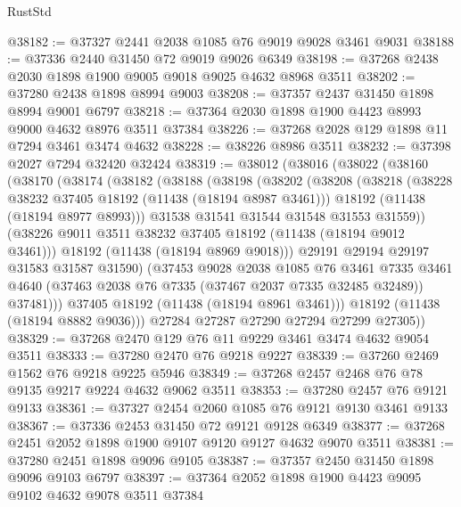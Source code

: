 \begin{lexlean}{RustStd}
\begin{coremodule}
@38182 := @37327 @2441 @2038 @1085 @76 @9019 @9028 @3461 @9031
@38188 := @37336 @2440 @31450 @72 @9019 @9026 @6349
@38198 := @37268 @2438 @2030 @1898 @1900 @9005 @9018 @9025 @4632 @8968 @3511
@38202 := @37280 @2438 @1898 @8994 @9003
@38208 := @37357 @2437 @31450 @1898 @8994 @9001 @6797
@38218 := @37364 @2030 @1898 @1900 @4423 @8993 @9000 @4632 @8976 @3511 @37384
@38226 := @37268 @2028 @129 @1898 @11 @7294 @3461 @3474 @4632
@38228 := @38226 @8986 @3511
@38232 := @37398 @2027 @7294 @32420 @32424
@38319 := @38012
    (@38016
      (@38022
        (@38160
          (@38170
            (@38174
              (@38182
                (@38188
                  (@38198
                    (@38202
                      (@38208
                        (@38218
                          (@38228 @38232 @37405 @18192 (@11438 (@18194 @8987 @3461)))
                          @18192
                          (@11438 (@18194 @8977 @8993)))
                        @31538
                        @31541
                        @31544
                        @31548
                        @31553
                        @31559))
                    (@38226 @9011 @3511 @38232 @37405 @18192 (@11438 (@18194 @9012 @3461)))
                    @18192
                    (@11438 (@18194 @8969 @9018)))
                  @29191
                  @29194
                  @29197
                  @31583
                  @31587
                  @31590)
                (@37453
                  @9028
                  @2038
                  @1085
                  @76
                  @3461
                  @7335
                  @3461
                  @4640
                  (@37463 @2038 @76 @7335 (@37467 @2037 @7335 @32485 @32489))
                  @37481)))
            @37405
            @18192
            (@11438 (@18194 @8961 @3461)))
          @18192
          (@11438 (@18194 @8882 @9036)))
        @27284
        @27287
        @27290
        @27294
        @27299
        @27305))
@38329 := @37268 @2470 @129 @76 @11 @9229 @3461 @3474 @4632 @9054 @3511
@38333 := @37280 @2470 @76 @9218 @9227
@38339 := @37260 @2469 @1562 @76 @9218 @9225 @5946
@38349 := @37268 @2457 @2468 @76 @78 @9135 @9217 @9224 @4632 @9062 @3511
@38353 := @37280 @2457 @76 @9121 @9133
@38361 := @37327 @2454 @2060 @1085 @76 @9121 @9130 @3461 @9133
@38367 := @37336 @2453 @31450 @72 @9121 @9128 @6349
@38377 := @37268 @2451 @2052 @1898 @1900 @9107 @9120 @9127 @4632 @9070 @3511
@38381 := @37280 @2451 @1898 @9096 @9105
@38387 := @37357 @2450 @31450 @1898 @9096 @9103 @6797
@38397 := @37364 @2052 @1898 @1900 @4423 @9095 @9102 @4632 @9078 @3511 @37384

\end{coremodule}
\end{lexlean}
